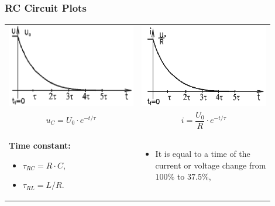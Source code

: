 \documentclass{beamer}
\begin{document}
	\begin{frame}
    \frametitle{RC Circuit Plots}
		\begin{center}
		\begin{tabular}{m{0.45\linewidth} m{0.45\linewidth}}
			\includegraphics[scale=0.4]{obr16_obvodRCNapeti.png} & \includegraphics[scale=0.44]{obr15_obvodRCProud.png}\\
			$$u_C = U_0\cdot e^{-t/\tau}$$											 & $$i = \frac{U_0}{R}\cdot e^{-t/\tau}$$\\
			\small{\textbf{Time constant:} 
			\begin{itemize}
				\item $\tau_{RC} = R\cdot C$,
				\item $\tau_{RL} = L/R$.
			\end{itemize}}
																													 & \small{\begin{itemize}
																															 \item It is equal to a time of the current or voltage change from $100\%$ to $37.5\%$,
																														 \end{itemize}}
		\end{tabular}
		\end{center}
  \end{frame}
\end{document}
